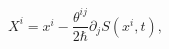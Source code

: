 \begin{equation}
X^{i}=x^{i}-\frac{\theta^{ij}}{2\hbar}\partial_{j}S(x^{i},t),\label{22.3}%
\end{equation}

